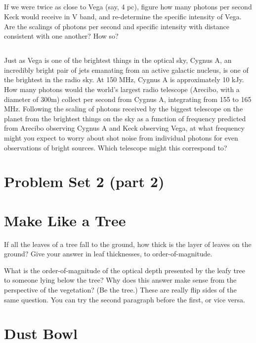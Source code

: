 \documentclass[11pt]{article}
\begin{document}
\subsection{}
If we were twice as close to Vega (say, 4 pc), figure how many photons per second Keck would receive
in V band, and re-determine the specific intensity of Vega.  Are the scalings of photons per second and
specific intensity with distance consistent with one another?  How so?

\subsection{}
Just as Vega is one of the brightest things in the optical sky, Cygnus A, an incredibly bright
pair of jets emanating from an active galactic nucleus, is
one of the brightest in the radio sky. At 150 MHz, Cygnus A is approximately 10 kJy.
How many photons would the world's largest radio telescope (Arecibo, with a diameter of 300m)
collect per second from Cygnus A, integrating from 155 to 165 MHz.  Following the scaling of
photons received by the biggest telescope on the planet from the brightest things on the sky as
a function of frequency predicted from Arecibo observing Cygnus A and Keck observing Vega, at
what frequency might you expect to worry about shot noise from individual photons for even observations
of bright sources.  Which telescope might this correspond to?

\section*{\centering Problem Set 2 (part 2)}

\section{Make Like a Tree}

If all the leaves of a tree fall to the ground, how thick is the layer of leaves on the ground?
Give your answer in leaf thicknesses, to order-of-magnitude.

What is the order-of-magnitude of the optical depth presented by the leafy tree to
someone lying below the tree? Why does this answer make sense from the perspective
of the vegetation? (Be the tree.)
These are really flip sides of the same question. You can try the second
paragraph before the first, or vice versa.

\section{Dust Bowl}
\end{document}
